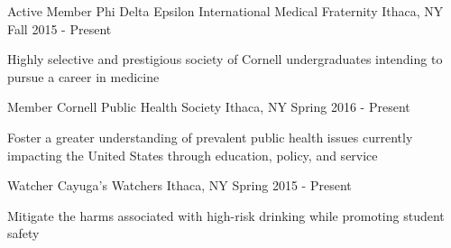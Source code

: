 \begin{cventries}
  \cventry
    {Active Member} %
    {Phi Delta Epsilon International Medical Fraternity} %
    {Ithaca, NY} %
    {Fall 2015 - Present} %
    {
      \begin{cvitems} %
        \item {Highly selective and prestigious society of Cornell undergraduates intending to pursue a career in medicine} 
      \end{cvitems}
    }


  \cventry
    {Member} %
    {Cornell Public Health Society} %
    {Ithaca, NY} %
    {Spring 2016 - Present} %
    {
      \begin{cvitems} %
        \item {Foster a greater understanding of prevalent public health issues currently impacting the United States through education, policy, and service}
      \end{cvitems}
    }
    
    \cventry
    {Watcher} %
    {Cayuga's Watchers} %
    {Ithaca, NY} %
    {Spring 2015 - Present} %
    {
      \begin{cvitems} %
        \item {Mitigate the harms associated with high-risk drinking while promoting student safety}
      \end{cvitems} 
    }

\end{cventries}
